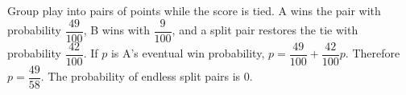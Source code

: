 Group play into pairs of points while the score is tied. A wins the pair with probability $\dfrac{49}{100}$, B wins with $\dfrac{9}{100}$, and a split pair restores the tie with probability $\dfrac{42}{100}$. If $p$ is A's eventual win probability, $p=\dfrac{49}{100}+\dfrac{42}{100}p$. Therefore $\boxed{p=\dfrac{49}{58}}$. The probability of endless split pairs is 0.
